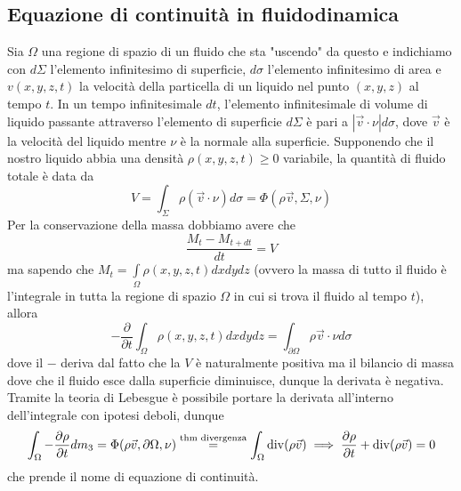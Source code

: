 \subsection{Equazione di continuità in fluidodinamica}
Sia $\Omega$ una regione di spazio di un fluido che sta "uscendo" da questo e indichiamo con $d\Sigma$ l'elemento infinitesimo di superficie, $d\sigma$ l'elemento infinitesimo di area e $v(x, y, z, t)$ la velocità della particella di un liquido nel punto $(x, y, z)$ al tempo $t$. In un tempo
infinitesimale $dt$, l'elemento infinitesimale di volume di liquido passante attraverso l'elemento di superficie $d\Sigma$ è pari a $|\vec{v} \cdot \nu|d\sigma$, dove $\vec{v}$ è la velocità del liquido mentre $\nu$ è la normale alla
superficie. Supponendo che il nostro liquido abbia una densità $\rho(x, y, z, t) \geq 0$ variabile, la quantità di fluido totale è data da
$$
V = \int_\Sigma \rho (\vec{v} \cdot \nu)d\sigma = \Phi(\rho \vec{v}, \Sigma, \nu) 
$$
Per la conservazione della massa dobbiamo avere che
$$
\frac{M_t - M_{t+dt}}{dt} = V
$$
ma sapendo che $M_t = \int\limits_\Omega \rho(x, y, z, t) dxdydz$ (ovvero la massa di tutto il fluido è l'integrale in tutta la regione di spazio $\Omega$ in cui si trova il fluido al tempo $t$), allora
$$
-\frac{\partial}{\partial t} \int_\Omega \rho(x, y, z, t)dxdydz = \int_{\partial \Omega} \rho \vec{v} \cdot \nu d\sigma
$$
dove il $-$ deriva dal fatto che la $V$ è naturalmente positiva ma il bilancio di massa dove che il fluido esce dalla superficie diminuisce, dunque la derivata è negativa. Tramite la teoria di Lebesgue è possibile portare la derivata all'interno dell'integrale con ipotesi deboli, dunque
$$
\int_\Omega - \frac{\partial \rho}{\partial t} dm_3 = \Phi(\rho \vec{v}, \partial \Omega, \nu) \stackrel{\text{thm divergenza}}{=} \int_\Omega \operatorname{div}(\rho \vec{v}) \implies \frac{\partial \rho}{\partial t} + \operatorname{div}(\rho \vec{v}) = 0
$$
che prende il nome di equazione di continuità.

